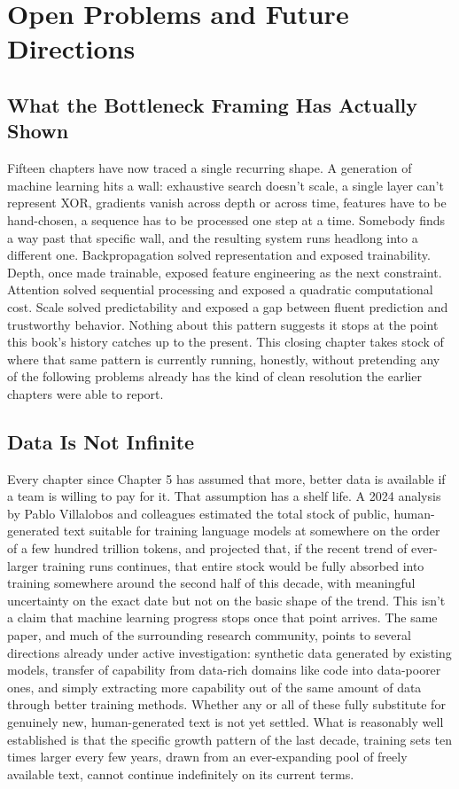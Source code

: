 \chapter{Open Problems and Future Directions}

\section*{What the Bottleneck Framing Has Actually Shown}

Fifteen chapters have now traced a single recurring shape. A generation of machine learning hits a wall: exhaustive search doesn't scale, a single layer can't represent XOR, gradients vanish across depth or across time, features have to be hand-chosen, a sequence has to be processed one step at a time. Somebody finds a way past that specific wall, and the resulting system runs headlong into a different one. Backpropagation solved representation and exposed trainability. Depth, once made trainable, exposed feature engineering as the next constraint. Attention solved sequential processing and exposed a quadratic computational cost. Scale solved predictability and exposed a gap between fluent prediction and trustworthy behavior. Nothing about this pattern suggests it stops at the point this book's history catches up to the present. This closing chapter takes stock of where that same pattern is currently running, honestly, without pretending any of the following problems already has the kind of clean resolution the earlier chapters were able to report.

\section*{Data Is Not Infinite}

Every chapter since Chapter 5 has assumed that more, better data is available if a team is willing to pay for it. That assumption has a shelf life. A 2024 analysis by Pablo Villalobos and colleagues estimated the total stock of public, human-generated text suitable for training language models at somewhere on the order of a few hundred trillion tokens, and projected that, if the recent trend of ever-larger training runs continues, that entire stock would be fully absorbed into training somewhere around the second half of this decade, with meaningful uncertainty on the exact date but not on the basic shape of the trend. This isn't a claim that machine learning progress stops once that point arrives. The same paper, and much of the surrounding research community, points to several directions already under active investigation: synthetic data generated by existing models, transfer of capability from data-rich domains like code into data-poorer ones, and simply extracting more capability out of the same amount of data through better training methods. Whether any or all of these fully substitute for genuinely new, human-generated text is not yet settled. What is reasonably well established is that the specific growth pattern of the last decade, training sets ten times larger every few years, drawn from an ever-expanding pool of freely available text, cannot continue indefinitely on its current terms.


